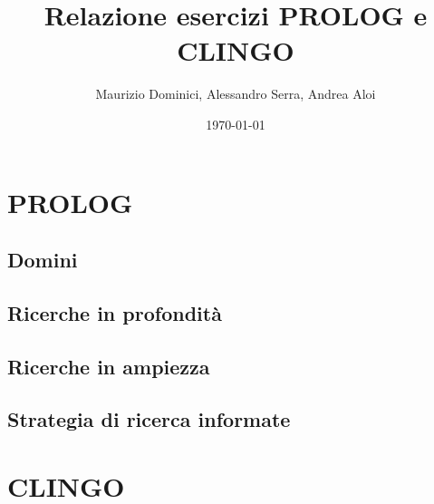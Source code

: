 \documentclass[a4paper,12pt, twoside]{report}
\title{Relazione esercizi PROLOG e CLINGO}
\author{Maurizio Dominici, Alessandro Serra, Andrea Aloi}
\date{\today}
\begin{document}
\maketitle
 
\tableofcontents

\part{PROLOG}
\chapter{Domini}


\chapter{Ricerche in profondità}


\chapter{Ricerche in ampiezza}


\chapter{Strategia di ricerca informate} \label{cap:ric-inf}


\part{CLINGO}

\end{document}
